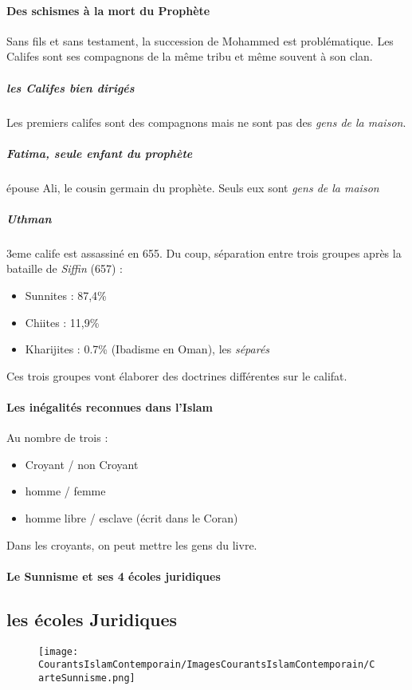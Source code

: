 \paragraph{Des schismes à la mort du Prophète} Sans fils et sans testament, la succession de Mohammed est problématique. Les Califes sont ses compagnons de la même tribu et même souvent à son clan. 

\subparagraph{les Califes bien dirigés} Les premiers califes sont des compagnons mais ne sont pas des \textit{ gens de la maison}.
 
\subparagraph{Fatima, seule enfant du prophète} épouse Ali, le cousin germain du prophète. Seuls eux sont \textit{gens de la maison}

\subparagraph{Uthman} 3eme calife est assassiné en 655. Du coup, séparation entre trois groupes après la bataille de \textit{Siffin} (657) : 

\begin{itemize}
\item Sunnites : 87,4\%
\item Chiites : 11,9\%
\item Kharijites : 0.7\% (Ibadisme en Oman), les \textit{séparés}
\end{itemize}

Ces trois groupes vont élaborer des doctrines différentes sur le califat.

\paragraph{Les inégalités reconnues dans l'Islam}
Au nombre de trois :  
\begin{itemize}
\item Croyant / non Croyant
\item homme / femme
\item homme libre / esclave (écrit dans le Coran)
\end{itemize}
Dans les croyants, on peut mettre les gens du livre. 

\paragraph{Le Sunnisme et ses 4 écoles juridiques}
\subsection{les écoles Juridiques}
\begin{figure}
    \centering
    \texttt{[image: CourantsIslamContemporain/ImagesCourantsIslamContemporain/CarteSunnisme.png]}
 
    \label{fig:my_label}
\end{figure}




